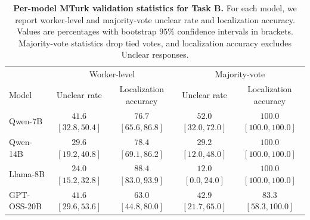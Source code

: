 \begin{table}[t]
\centering
\scriptsize
\setlength{\tabcolsep}{4pt}
\renewcommand{\arraystretch}{1.35}
\caption{
\textbf{Per-model MTurk validation statistics for Task B.}
For each model, we report worker-level and majority-vote unclear rate and localization accuracy.
Values are percentages with bootstrap \(95\%\) confidence intervals in brackets. Majority-vote statistics drop tied votes, and localization accuracy excludes Unclear responses.
}
\label{tab:taskb_per_model_mturk}
\begin{tabular*}{\columnwidth}{@{\extracolsep{\fill}}lcccc@{}}
\toprule
& \multicolumn{2}{c}{Worker-level} & \multicolumn{2}{c}{Majority-vote} \\
\cmidrule(lr){2-3}
\cmidrule(lr){4-5}
Model & Unclear rate & Localization accuracy & Unclear rate & Localization accuracy \\
\midrule
Qwen-7B & \makecell{\(41.6\) \\ {\scriptsize \([32.8,50.4]\)}} & \makecell{\(76.7\) \\ {\scriptsize \([65.6,86.8]\)}} & \makecell{\(52.0\) \\ {\scriptsize \([32.0,72.0]\)}} & \makecell{\(100.0\) \\ {\scriptsize \([100.0,100.0]\)}} \\
Qwen-14B & \makecell{\(29.6\) \\ {\scriptsize \([19.2,40.8]\)}} & \makecell{\(78.4\) \\ {\scriptsize \([69.1,86.2]\)}} & \makecell{\(29.2\) \\ {\scriptsize \([12.0,48.0]\)}} & \makecell{\(100.0\) \\ {\scriptsize \([100.0,100.0]\)}} \\
Llama-8B & \makecell{\(24.0\) \\ {\scriptsize \([15.2,32.8]\)}} & \makecell{\(88.4\) \\ {\scriptsize \([83.0,93.9]\)}} & \makecell{\(12.0\) \\ {\scriptsize \([0.0,24.0]\)}} & \makecell{\(100.0\) \\ {\scriptsize \([100.0,100.0]\)}} \\
GPT-OSS-20B & \makecell{\(41.6\) \\ {\scriptsize \([29.6,53.6]\)}} & \makecell{\(63.0\) \\ {\scriptsize \([44.8,80.0]\)}} & \makecell{\(42.9\) \\ {\scriptsize \([21.7,65.0]\)}} & \makecell{\(83.3\) \\ {\scriptsize \([58.3,100.0]\)}} \\
\bottomrule
\end{tabular*}
\end{table}
